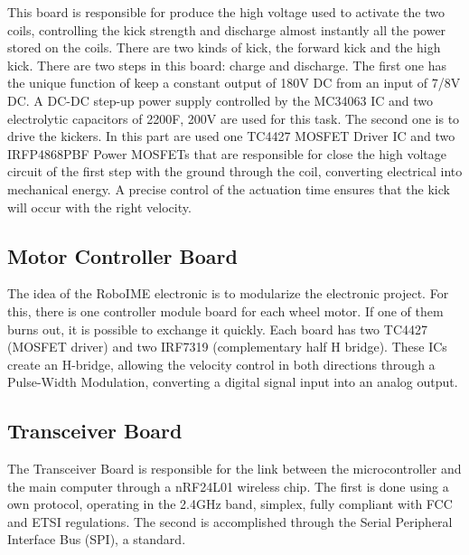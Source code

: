 This board is responsible for produce the high voltage used to activate the two
coils, controlling the kick strength and discharge almost instantly all the
power stored on the coils. There are two kinds of kick, the forward kick and
the high kick. There are two steps in this board: charge and discharge. The
first one has the unique function of keep a constant output of 180V DC from an
input of 7/8V DC. A DC-DC step-up power supply controlled by the MC34063 IC and
two electrolytic capacitors of 2200F, 200V are used for this task. The second
one is to drive the kickers. In this part are used one TC4427 MOSFET Driver IC
and two IRFP4868PBF Power MOSFETs that are responsible for close the high
voltage circuit of the first step with the ground through the coil, converting
electrical into mechanical energy. A precise control of the actuation time
ensures that the kick will occur with the right velocity.



\subsection{Motor Controller Board}

The idea of the RoboIME electronic is to modularize the electronic project. For
this, there is one controller module board for each wheel motor. If one of them
burns out, it is possible to exchange it quickly. Each board has two TC4427
(MOSFET driver) and two IRF7319 (complementary half H bridge). These ICs create
an H-bridge, allowing the velocity control in both directions through a
Pulse-Width Modulation, converting a digital signal input into an analog
output.


\subsection{Transceiver Board}

The Transceiver Board is responsible for the link between the microcontroller
and the main computer through a nRF24L01 wireless chip. The first is done using a
own protocol, operating in the 2.4GHz band, simplex, fully compliant with FCC and
ETSI regulations. The second is accomplished through the Serial Peripheral
Interface Bus (SPI), a standard.

